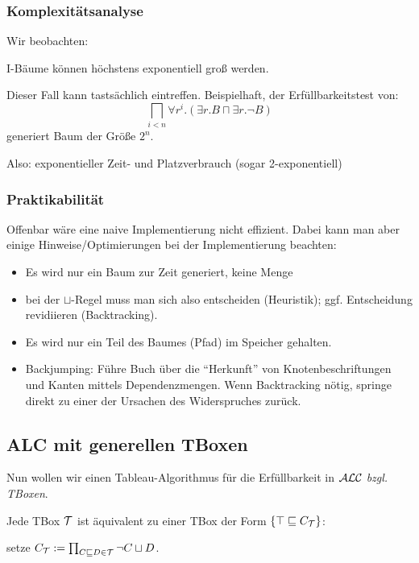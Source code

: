\subsubsection{Komplexitätsanalyse}\label{praktikabilituxe4t}

Wir beobachten: 

I-Bäume können höchstens exponentiell groß werden.

Dieser Fall kann tastsächlich eintreffen. Beispielhaft, der Erfüllbarkeitstest von:
$$\bigsqcap_{i < n} \forall r^i .(\exists r.B \sqcap \exists r.\neg B)$$
generiert Baum der Größe $2^n$.

Also: exponentieller Zeit- und Platzverbrauch (sogar 2-exponentiell)

\subsubsection{Praktikabilität}

Offenbar wäre eine naive Implementierung nicht effizient. Dabei kann man aber einige Hinweise/Optimierungen bei der Implementierung beachten:

\begin{itemize}
	\item Es wird nur ein Baum zur Zeit generiert, keine Menge
	\item bei der $\sqcup$-Regel muss man sich also entscheiden (Heuristik); ggf. Entscheidung revidiieren (Backtracking).
	\item Es wird nur ein Teil des Baumes (Pfad) im Speicher gehalten.
    \item Backjumping: Führe Buch über die \enquote{Herkunft} von Knotenbeschriftungen und Kanten mittels Dependenzmengen. Wenn Backtracking nötig, springe direkt zu einer der Ursachen des Widerspruches zurück.
\end{itemize}

\subsection{ALC mit generellen TBoxen}\label{alc-mit-generellen-tboxen}

Nun wollen wir einen Tableau-Algorithmus für die Erfüllbarkeit in $\mathcal{A}\mathcal{L}\mathcal{C}$  \emph{bzgl. TBoxen}.

Jede TBox $\mathcal{T}$ ist äquivalent zu einer TBox der Form
$\left\{ \top \sqsubseteq C_{\MT} \right\}$: 

\begin{center}setze $C_{\mathcal{T}} := \prod_{C \sqsubseteq D \in \mathcal{T}}^{}{\neg C \sqcup D}$.\end{center}

